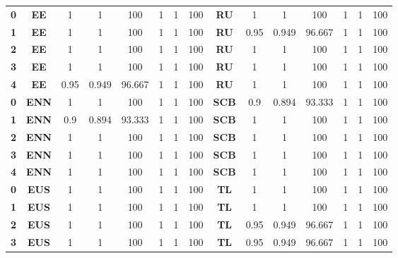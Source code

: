 {{\begin{tabular}{c|c|cccccc|ccccccc}
\textbf{0} & \textbf{EE} & 1     & 1     & 100   & 1     & 1     & 100   & \multicolumn{1}{c|}{\textbf{RU}} & 1     & 1     & 100   & 1     & 1     & 100 \\
\textbf{1} & \textbf{EE} & 1     & 1     & 100   & 1     & 1     & 100   & \multicolumn{1}{c|}{\textbf{RU}} & 0.95  & 0.949 & 96.667 & 1     & 1     & 100 \\
\textbf{2} & \textbf{EE} & 1     & 1     & 100   & 1     & 1     & 100   & \multicolumn{1}{c|}{\textbf{RU}} & 1     & 1     & 100   & 1     & 1     & 100 \\
\textbf{3} & \textbf{EE} & 1     & 1     & 100   & 1     & 1     & 100   & \multicolumn{1}{c|}{\textbf{RU}} & 1     & 1     & 100   & 1     & 1     & 100 \\
\textbf{4} & \textbf{EE} & 0.95  & 0.949 & 96.667 & 1     & 1     & 100   & \multicolumn{1}{c|}{\textbf{RU}} & 1     & 1     & 100   & 1     & 1     & 100 \\
\textbf{0} & \textbf{ENN} & 1     & 1     & 100   & 1     & 1     & 100   & \multicolumn{1}{c|}{\textbf{SCB}} & 0.9   & 0.894 & 93.333 & 1     & 1     & 100 \\
\textbf{1} & \textbf{ENN} & 0.9   & 0.894 & 93.333 & 1     & 1     & 100   & \multicolumn{1}{c|}{\textbf{SCB}} & 1     & 1     & 100   & 1     & 1     & 100 \\
\textbf{2} & \textbf{ENN} & 1     & 1     & 100   & 1     & 1     & 100   & \multicolumn{1}{c|}{\textbf{SCB}} & 1     & 1     & 100   & 1     & 1     & 100 \\
\textbf{3} & \textbf{ENN} & 1     & 1     & 100   & 1     & 1     & 100   & \multicolumn{1}{c|}{\textbf{SCB}} & 1     & 1     & 100   & 1     & 1     & 100 \\
\textbf{4} & \textbf{ENN} & 1     & 1     & 100   & 1     & 1     & 100   & \multicolumn{1}{c|}{\textbf{SCB}} & 1     & 1     & 100   & 1     & 1     & 100 \\
\textbf{0} & \textbf{EUS} & 1     & 1     & 100   & 1     & 1     & 100   & \multicolumn{1}{c|}{\textbf{TL}} & 1     & 1     & 100   & 1     & 1     & 100 \\
\textbf{1} & \textbf{EUS} & 1     & 1     & 100   & 1     & 1     & 100   & \multicolumn{1}{c|}{\textbf{TL}} & 1     & 1     & 100   & 1     & 1     & 100 \\
\textbf{2} & \textbf{EUS} & 1     & 1     & 100   & 1     & 1     & 100   & \multicolumn{1}{c|}{\textbf{TL}} & 0.95  & 0.949 & 96.667 & 1     & 1     & 100 \\
\textbf{3} & \textbf{EUS} & 1     & 1     & 100   & 1     & 1     & 100   & \multicolumn{1}{c|}{\textbf{TL}} & 0.95  & 0.949 & 96.667 & 1     & 1     & 100 \\

\end{tabular}}}
